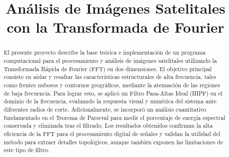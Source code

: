 \documentclass[conference]{IEEEtran}
\begin{document}
\title{Análisis de Imágenes Satelitales con la Transformada de Fourier\\}

\author{
\and
{}
\and
{}
\and
{}
}

\maketitle

\begin{abstract}
El presente proyecto describe la base teórica e implementación de un programa computacional para el procesamiento y análisis de imágenes satelitales utilizando la Transformada Rápida de Fourier (FFT) en dos dimensiones. El objetivo principal consiste en aislar y resaltar las características estructurales de alta frecuencia, tales como frentes nubosos y contornos geográficos, mediante la atenuación de las regiones de baja frecuencia. Para lograr esto, se aplicó un Filtro Pasa-Altas Ideal (IHPF) en el dominio de la frecuencia, evaluando la respuesta visual y numérica del sistema ante diferentes radios de corte. Adicionalmente, se incorporó un análisis cuantitativo fundamentado en el Teorema de Parseval para medir el porcentaje de energía espectral conservada y eliminada tras el filtrado. Los resultados obtenidos confirman la alta eficiencia de la FFT para el procesamiento digital de señales y validan la utilidad del método para extraer detalles topológicos, aunque también exponen las limitaciones de este tipo de filtro.
\end{abstract}
\end{document}
